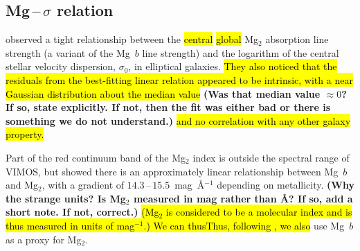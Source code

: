 \documentclass[a4paper,fleqn,usenatbib]{mnras}
\DeclareRobustCommand{\removed}[1]{{\sethlcolor{red}\hl{#1}}}
\DeclareRobustCommand{\added}[1]{{\sethlcolor{green}\hl{#1}}}
\begin{document}
\subsection{Mg\,--\,$\sigma$ relation}
\label{subsec:Mg-sigma}


\citet{Bender1993} observed a tight relationship between the \added{central} \removed{global}
Mg$_2$ absorption line strength (a variant of the Mg~$b$ line
strength) and the logarithm of the central stellar velocity
dispersion, $\sigma_0$, in elliptical galaxies. \removed{They also noticed that
the residuals from the best-fitting linear relation appeared to be
intrinsic, with a near Gaussian distribution about the median value}
{\bf (Was that median value $\approx0$? If so, state explicitly. If
  not, then the fit was either bad or there is something we do not
  understand.)} \removed{and no correlation with any other galaxy property.}

Part of the red continuum band of the Mg$_2$ index is outside the
spectral range of VIMOS, but \citet{Ziegler1997} showed there is an
approximately linear relationship between Mg~$b$ and Mg$_2$, with a
gradient of $14.3$\,--\,$15.5$~mag~\AA$^{-1}$ depending on
metallicity. {\bf (Why the strange units? Is Mg$_2$ measured in mag 
rather than \AA? If so, add a short note. If not, correct.)} 
\added{(Mg$_2$ is considered to be a molecular index and is thus measured 
in units of mag$^{-1}$.) We can thus}\removed{Thus, following \citet{Ziegler1997}, we also} use Mg~$b$ as a proxy for
Mg$_2$.
\end{document}
